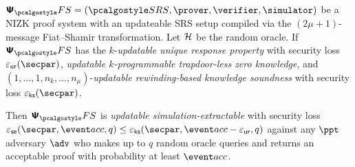 
\begin{theorem}
	\label{thm:se}
	$\psfs = (\SRScer, \prover, \verifier, \simulator)$ be a NIZK proof system with an updateable SRS setup compiled via the $(2\mu + 1)$-message Fiat--Shamir transformation. Let $\mathcal{H}$ be the random oracle. If $\psfs$ has the
	$k$-\emph{updatable unique response property} with security loss $\epsur(\secpar)$, 
	\emph{updatable $k$-programmable trapdoor-less zero knowledge}, and $(1, \ldots, 1, n_{k}, \ldots, n_\mu)$-\emph{updatable rewinding-based knowledge soundness} with security loss $\epscss(\secpar)$. 
	
	Then $\psfs$ is \emph{updatable simulation-extractable} with security loss $\epsse(\secpar,\accProb,q) \leq \epscss(\secpar,\accProb - \epsur,q)$ against any $\ppt$ adversary $\advse$ who makes up to $q$ random oracle queries and returns an acceptable proof with probability at least $\accProb$.
\end{theorem}

